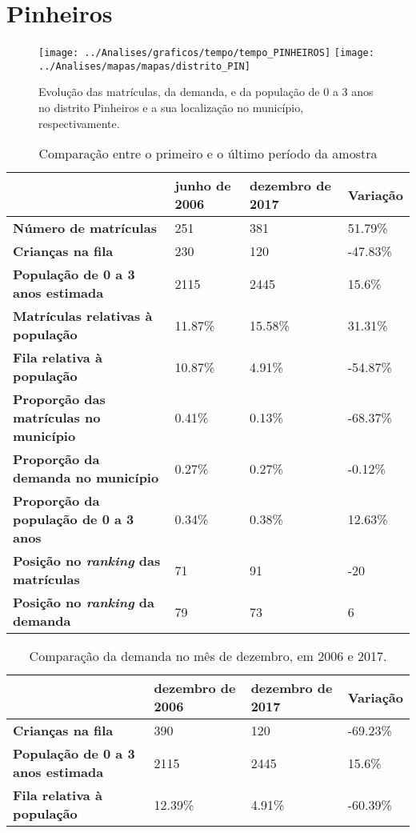 \section{Pinheiros}
\begin{figure}[H]
\centering
\texttt{[image: ../Analises/graficos/tempo/tempo\_PINHEIROS]}
\texttt{[image: ../Analises/mapas/mapas/distrito\_PIN]}
\caption{Evolução das matrículas, da demanda, e da população de 0 a 3 anos no distrito Pinheiros e a sua localização no município, respectivamente.}
\end{figure}
\begin{table}[H]
\begin{tabular}{l|l|l|l}
\textbf{}                                      & \textbf{junho de 2006}       & \textbf{dezembro de 2017}    & \textbf{Variação} \\ \hline
\textbf{Número de matrículas}                  & 251 & 381 & 51.79\% \\ \hline
\textbf{Crianças na fila}                      & 230 & 120 & -47.83\% \\ \hline
\textbf{População de 0 a 3 anos estimada}      & 2115 & 2445 & 15.6\% \\ \hline
\textbf{Matrículas relativas à população}      & 11.87\% & 15.58\% & 31.31\% \\ \hline
\textbf{Fila relativa à população}             & 10.87\% & 4.91\% & -54.87\% \\ \hline
\textbf{Proporção das matrículas no município} & 0.41\% & 0.13\% & -68.37\% \\ \hline
\textbf{Proporção da demanda no município}     & 0.27\% & 0.27\% & -0.12\% \\ \hline
\textbf{Proporção da população de 0 a 3 anos}  & 0.34\% & 0.38\% & 12.63\% \\ \hline
\textbf{Posição no \textit{ranking} das matrículas}     & 71 & 91 & -20 \\ \hline
\textbf{Posição no \textit{ranking} da demanda}         & 79 & 73 & 6 \\ 
\end{tabular}
\caption{Comparação entre o primeiro e o último período da amostra}
\end{table}
\begin{table}[H]
\begin{tabular}{l|l|l|l}
\textbf{}                                 & \textbf{dezembro de 2006} & \textbf{dezembro de 2017} & \textbf{Variação} \\ \hline
\textbf{Crianças na fila}                      & 390 & 120 & -69.23\% \\ \hline
\textbf{População de 0 a 3 anos estimada}      & 2115 & 2445 & 15.6\% \\ \hline
\textbf{Fila relativa à população}             & 12.39\% & 4.91\% & -60.39\% \\
\end{tabular}
\caption{Comparação da demanda no mês de dezembro, em 2006 e 2017.}
\end{table}
